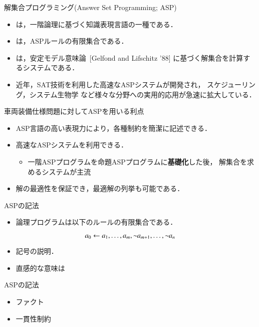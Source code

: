 \documentclass[dvipdfmx, 11pt]{beamer}
\begin{document}
\begin{frame}{解集合プログラミング(Answer Set Programming; ASP)}
 \begin{itemize}
 \item {}は，一階論理に基づく知識表現言語の一種である．
 \item {}は，ASPルールの有限集合である．
 \item {}は，安定モデル意味論~[Gelfond and Lifschitz '88]
   に基づく解集合を計算するシステムである．
 \item 近年，SAT技術を利用した高速なASPシステムが開発され，
   スケジューリング，システム生物学
   など様々な分野への実用的応用が急速に拡大している．
 \end{itemize}
\vfill
 \begin{alertblock}{車両装備仕様問題に対してASPを用いる利点}
   \begin{itemize} 
    \item ASP言語の高い表現力により，各種制約を簡潔に記述できる．
    \item 高速なASPシステムを利用できる．
	  \begin{itemize}
	   \item 一階ASPプログラムを命題ASPプログラムに\alert{\bf 基礎化}した後，
		 解集合を求めるシステムが主流
	  \end{itemize}
    \item 解の最適性を保証でき，最適解の列挙も可能である．
   \end{itemize}
 \end{alertblock}
\end{frame}
\begin{frame}{ASPの記法}
 \begin{itemize}
  \item 論理プログラムは以下のルールの有限集合である．
 \end{itemize}
 \begin{equation}
  a_0\leftarrow a_1,\dots,a_m,{\sim\!\!{a_{m+1}}},\dots,{\sim\!\!{a_n}}
 \end{equation}
 \begin{itemize}
  \item 記号の説明．
  \item 直感的な意味は
 \end{itemize}
\end{frame}
\begin{frame}{ASPの記法}
 \begin{itemize}
  \item ファクト
  \item 一貫性制約
 \end{itemize} 
\end{frame}
\end{document}
